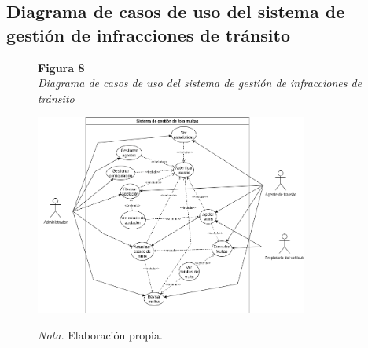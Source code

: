 \subsection{Diagrama de casos de uso del sistema de gestión de infracciones de tránsito }
\begin{figure}[htbp]
    \begin{flushleft}
        \textbf{Figura 8}\\[2em]
        \textit{Diagrama de casos de uso del sistema de gestión de infracciones de tránsito}
    \end{flushleft}
    \vspace{1em}
    \centering
    \includegraphics[width=0.8\textwidth]{Images/CasosUso.png}
    \vspace{2em}
    \begin{flushleft}
        \textit{Nota.} Elaboración propia.
    \end{flushleft}
    \label{fig:casos_uso}
\end{figure}

